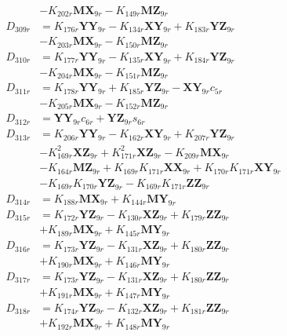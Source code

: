 \begin{align}
&- K_{202r}\mathbf{MX}_{9r} - K_{149r}\mathbf{MZ}_{9r} \nonumber \\
D_{309r} &= K_{176r}\mathbf{YY}_{9r} - K_{134r}\mathbf{XY}_{9r} + K_{183r}\mathbf{YZ}_{9r}  \nonumber \\
&- K_{203r}\mathbf{MX}_{9r} - K_{150r}\mathbf{MZ}_{9r} \nonumber \\
D_{310r} &= K_{177r}\mathbf{YY}_{9r} - K_{135r}\mathbf{XY}_{9r} + K_{184r}\mathbf{YZ}_{9r}  \nonumber \\
&- K_{204r}\mathbf{MX}_{9r} - K_{151r}\mathbf{MZ}_{9r} \nonumber \\
D_{311r} &= K_{178r}\mathbf{YY}_{9r} + K_{185r}\mathbf{YZ}_{9r} - \mathbf{XY}_{9r}c_{5r}  \nonumber \\
&- K_{205r}\mathbf{MX}_{9r} - K_{152r}\mathbf{MZ}_{9r} \nonumber \\
D_{312r} &= \mathbf{YY}_{9r}c_{6r} + \mathbf{YZ}_{9r}s_{6r} \nonumber \\
D_{313r} &= K_{206r}\mathbf{YY}_{9r} - K_{162r}\mathbf{XY}_{9r} + K_{207r}\mathbf{YZ}_{9r}  \nonumber \\
&- K_{169r}^2\mathbf{XZ}_{9r} + K_{171r}^2\mathbf{XZ}_{9r} - K_{209r}\mathbf{MX}_{9r}  \nonumber \\
&- K_{164r}\mathbf{MZ}_{9r} + K_{169r}K_{171r}\mathbf{XX}_{9r} + K_{170r}K_{171r}\mathbf{XY}_{9r}  \nonumber \\
&- K_{169r}K_{170r}\mathbf{YZ}_{9r} - K_{169r}K_{171r}\mathbf{ZZ}_{9r} \nonumber \\
D_{314r} &= K_{188r}\mathbf{MX}_{9r} + K_{144r}\mathbf{MY}_{9r} \nonumber \\
D_{315r} &= K_{172r}\mathbf{YZ}_{9r} - K_{130r}\mathbf{XZ}_{9r} + K_{179r}\mathbf{ZZ}_{9r}  \nonumber \\
&+ K_{189r}\mathbf{MX}_{9r} + K_{145r}\mathbf{MY}_{9r} \nonumber \\
D_{316r} &= K_{173r}\mathbf{YZ}_{9r} - K_{131r}\mathbf{XZ}_{9r} + K_{180r}\mathbf{ZZ}_{9r}  \nonumber \\
&+ K_{190r}\mathbf{MX}_{9r} + K_{146r}\mathbf{MY}_{9r} \nonumber \\
D_{317r} &= K_{173r}\mathbf{YZ}_{9r} - K_{131r}\mathbf{XZ}_{9r} + K_{180r}\mathbf{ZZ}_{9r}  \nonumber \\
&+ K_{191r}\mathbf{MX}_{9r} + K_{147r}\mathbf{MY}_{9r} \nonumber \\
D_{318r} &= K_{174r}\mathbf{YZ}_{9r} - K_{132r}\mathbf{XZ}_{9r} + K_{181r}\mathbf{ZZ}_{9r}  \nonumber \\
&+ K_{192r}\mathbf{MX}_{9r} + K_{148r}\mathbf{MY}_{9r} \nonumber \\

\end{align}

